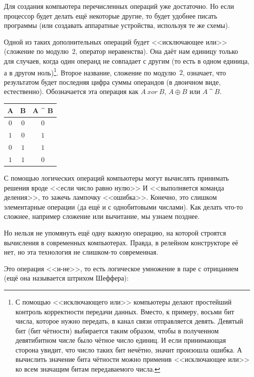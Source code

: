 Для создания компьютера перечисленных операций уже достаточно. Но если процессор будет делать
ещё некоторые другие, то будет удобнее писать программы (или создавать аппаратные устройства,
используя те же схемы).

Одной из таких дополнительных операций будет <<исключающее или>> (сложение по модулю~$2$, оператор неравенства).
Она даёт нам единицу только для случаев,
когда один операнд не совпадает с другим (то есть в одном единица, а в другом
ноль)\footnote{С помощью <<исключающего или>> компьютеры делают простейший контроль корректности передачи данных.
Вместо, к примеру, восьми бит числа, которое нужно передать, в канал связи отправляется девять.
Девятый бит (бит чётности) выбирается таким образом, чтобы в полученном девятибитном числе было чётное число
единиц. И если принимающая сторона увидит, что число таких бит нечётно, значит произошла ошибка.
А вычислить значение бита чётности можно применив <<исключающее или>> ко всем значащим битам передаваемого числа.}.
Второе название, сложение по модулю~$2$, означает, что результатом будет последняя цифра суммы операндов
(в двоичном виде, естественно).
Обозначается эта операция как $A\ xor\ B$, $A \oplus B$ или $A\ \mbox{\textasciicircum}\ B$.

\begin{center}
\begin{tabular}{|c|c|c|}
 \hline
 \textbf{A} & \textbf{B} & \textbf{A \textasciicircum{} B} \\ \hline
 $0$ & $0$ & $0$ \\ \hline
 $1$ & $0$ & $1$ \\ \hline
 $0$ & $1$ & $1$ \\ \hline
 $1$ & $1$ & $0$ \\ \hline
\end{tabular}
\end{center}

С помощью логических операций компьютеры могут вычислять принимать решения вроде <<если число равно нулю>> И <<выполняется команда деления>>,
то зажечь лампочку <<ошибка>>.
Конечно, это слишком элементарные операции (да ещё и с однобитовыми числами).
Как делать что-то сложнее, например сложение или вычитание, мы узнаем позднее.

Но нельзя не упомянуть ещё одну важную операцию, на которой строятся вычисления в современных
компьютерах. Правда, в релейном конструкторе её нет, но эта технология не слишком-то современная.

Это операция <<и-не>>, то есть логическое умножение в паре с отрицанием (ещё она называется штрихом Шеффера):

